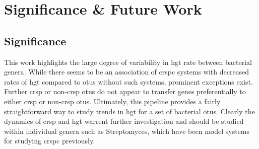 \section{Significance \& Future Work}
\subsection{Significance}
This work highlights the large degree of variability in \ac{hgt} rate between bacterial genera.
While there seems to be an association of \ac{crspc} systems with decreased rates of \ac{hgt} compared to \ac{otu}s without such systems, prominent exceptions exist.
Further \ac{crsp} or non-\ac{crsp} \ac{otu}s do not appear to transfer genes preferentially to either \ac{crsp} or non-\ac{crsp} \ac{otu}s.
Ultimately, this pipeline provides a fairly straightforward way to study trends in \ac{hgt} for a set of bacterial \ac{otu}s.
Clearly the dynamics of \ac{crsp} and \ac{hgt} warrent further investigation and should be studied within individual genera such as Streptomyces, which have been model systems for studying \ac{crspc} previously.
